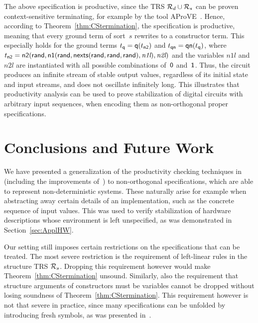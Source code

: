 \documentclass{eptcs}
\begin{document}
The above specification is productive, since the TRS $\mathcal{R}_d \cup \mathcal{R}_s$ can be
proven context-sensitive terminating, for example by the tool
AProVE~\cite{AProVE06}.
Hence, according to Theorem~\ref{thm:CStermination}, the specification is
productive, meaning that every ground term of sort~$s$ rewrites to a constructor
term. This especially holds for the ground terms
$t_{\mathsf{q}} = \mathsf{q}(t_{\mathsf{n2}})$
and
$t_{\mathsf{qn}} = \mathsf{qn}(t_{\mathsf{q}})$,
where
$t_{\mathsf{n2}} = \mathsf{n2}(
    \mathsf{rand},
    \mathsf{n1}(
        \mathsf{rand},
        \mathsf{nexts}(
            \mathsf{rand},\mathsf{rand},\mathsf{rand}
        ),
        \textit{n1l}
    ),
    \textit{n2l}
)$
and the variables $\textit{n1l}$ and $\textit{n2l}$ are instantiated with all
possible combinations of~$\mathsf{0}$ and~$\mathsf{1}$. Thus, the circuit produces an
infinite stream of stable output values, regardless of its initial state and
input streams, and does not oscillate infinitely long. This illustrates that
productivity analysis can be used to prove stabilization of digital circuits
with arbitrary input sequences, when encoding them as non-orthogonal
proper specifications.


\section{Conclusions and Future Work}
\label{sec:Conclusions}

We have presented a generalization of the productivity checking techniques
in~\cite{ZR10} (including the improvements of~\cite{EH11})
to non-orthogonal specifications, which are able to represent non-deterministic
systems. These naturally arise for example when abstracting away certain details
of an implementation, such as the concrete sequence of input values. This was
used to verify stabilization of hardware descriptions whose environment is left
unspecified, as was demonstrated in Section~\ref{sec:ApplHW}.

Our setting still imposes certain restrictions on the specifications that can be
treated. The most severe restriction is the requirement of left-linear rules in
the structure TRS $\mathcal{R}_s$.
Dropping this requirement however would make Theorem~\ref{thm:CStermination}
unsound.
Similarly, also the requirement that structure arguments of constructors must be
variables cannot be dropped without losing soundness of
Theorem~\ref{thm:CStermination}. This requirement however is not that severe in
practice, since many specifications can be unfolded by introducing fresh
symbols, as was presented in~\cite{EH11,Z09}.
\end{document}

